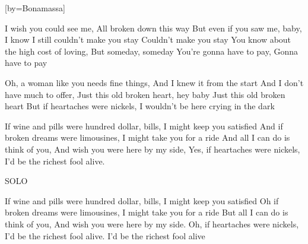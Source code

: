 

[by=Bonamassa]

\begin{LARGE}

\beginverse
I wish you could see me, All broken down this way
But even if you saw me, baby, I know I still couldn't make you stay
Couldn't make you stay
You know about the high cost of loving, But someday, someday
You're gonna have to pay, Gonna have to pay
\endverse

\beginverse
Oh, a woman like you needs fine things, And I knew it from the start
And I don't have much to offer, Just this old broken heart, hey baby
Just this old broken heart
But if heartaches were nickels, I wouldn't be here crying in the dark
\endverse

\beginverse
If wine and pills were hundred dollar, bills, I might keep you satisfied
And if broken dreams were limousines, I might take you for a ride
And all I can do is think of you, And wish you were here by my side,
Yes, if heartaches were nickels, I'd be the richest fool alive.
\endverse

\beginverse
SOLO
\endverse

\beginverse
If wine and pills were hundred dollar, bills, I might keep you satisfied
Oh if broken dreams were limousines, I might take you for a ride
But all I can do is think of you, And wish you were here by my side.
Oh, if heartaches were nickels, I'd be the richest fool alive. 
I'd be the richest fool alive
\endverse

\end{LARGE}



\chordson
\endsong
